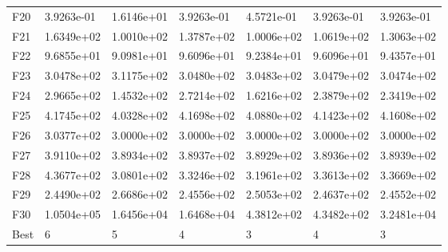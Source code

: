 \begin{tabular}{lllllll}
F20  &  3.9263e-01 &  1.6146e+01 &  3.9263e-01 &  4.5721e-01 &  3.9263e-01 &  3.9263e-01 \\
F21  &  1.6349e+02 &  1.0010e+02 &  1.3787e+02 &  1.0006e+02 &  1.0619e+02 &  1.3063e+02 \\
F22  &  9.6855e+01 &  9.0981e+01 &  9.6096e+01 &  9.2384e+01 &  9.6096e+01 &  9.4357e+01 \\
F23  &  3.0478e+02 &  3.1175e+02 &  3.0480e+02 &  3.0483e+02 &  3.0479e+02 &  3.0474e+02 \\
F24  &  2.9665e+02 &  1.4532e+02 &  2.7214e+02 &  1.6216e+02 &  2.3879e+02 &  2.3419e+02 \\
F25  &  4.1745e+02 &  4.0328e+02 &  4.1698e+02 &  4.0880e+02 &  4.1423e+02 &  4.1608e+02 \\
F26  &  3.0377e+02 &  3.0000e+02 &  3.0000e+02 &  3.0000e+02 &  3.0000e+02 &  3.0000e+02 \\
F27  &  3.9110e+02 &  3.8934e+02 &  3.8937e+02 &  3.8929e+02 &  3.8936e+02 &  3.8939e+02 \\
F28  &  4.3677e+02 &  3.0801e+02 &  3.3246e+02 &  3.1961e+02 &  3.3613e+02 &  3.3669e+02 \\
F29  &  2.4490e+02 &  2.6686e+02 &  2.4556e+02 &  2.5053e+02 &  2.4637e+02 &  2.4552e+02 \\
F30  &  1.0504e+05 &  1.6456e+04 &  1.6468e+04 &  4.3812e+02 &  4.3482e+02 &  3.2481e+04 \\
Best &           6 &           5 &           4 &           3 &           4 &           3 \\
\bottomrule
\end{tabular}
